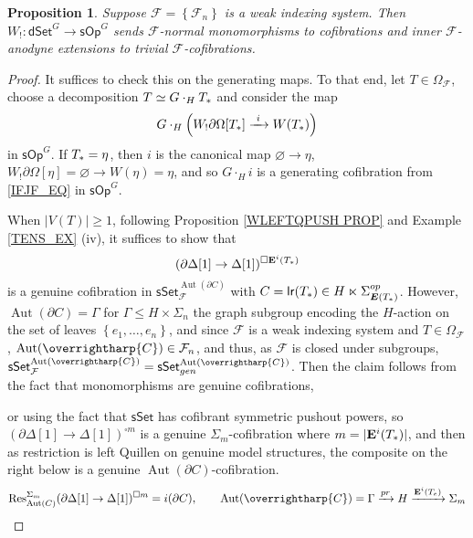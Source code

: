 \documentclass[a4paper,10pt
,draft
]{article}%
\numberwithin{equation}{section}
\numberwithin{figure}{section}
\newtheorem{proposition}[equation]{Proposition}%
\theoremstyle{definition} %
\newcommand{\set}[1]{\left\{#1\right\}}%
\newcommand{\vect}[1]{\text{\overrightharp{\ensuremath{#1}}}}
\newcommand{\sSet}{\ensuremath{\mathsf{sSet}}}%
\newcommand{\sOp}{\ensuremath{\mathsf{sOp}}}%
\newcommand{\dSet}{\mathsf{dSet}}
\DeclareMathOperator{\Aut}{Aut}%
\newcommand{\F}{\ensuremath{\mathcal F}}
\newcommand{\1}{\ensuremath{\mathbbm 1}}%
\begin{document}
\begin{proposition}
      \label{W!_COF_PROP}
      Suppose $\F = \set{\F_n}$ is a weak indexing system.
      Then $W_!: \dSet^G \to \sOp^G$ sends $\F$-normal monomorphisms to cofibrations and inner $\F$-anodyne extensions to trivial $\F$-cofibrations.
\end{proposition}
\begin{proof}
      It suffices to check this on the generating maps.
      To that end, let $T \in \Omega_\F$, choose a decomposition $T \simeq G \cdot_H T_{\**}$ and consider the map
       \begin{equation}
            G \cdot_H \left( W_! \partial \Omega[T_{\**}] \xrightarrow{\ i \ } W(T_{\**}) \right)      
      \end{equation}
      in $\sOp^G$.
      If $T_{\**} = \eta$, then $i$ is the canonical map $\varnothing \to \eta$,
      $W_! \partial \Omega[\eta] = \varnothing \to W(\eta) = \eta$,
      and so $G \cdot_H i$ is a generating cofibration from \eqref{IFJF_EQ} in $\sOp^G$.
      
      When $|V(T)| \geq 1$, following Proposition \ref{WLEFTQPUSH PROP} and Example \ref{TENS_EX} (iv),
      it suffices to show that
      \[
            (\partial \Delta[1] \to \Delta[1])^{\square \mathbf E^i(T_{\**})}
      \]
      is a genuine cofibration in $\sSet^{\Aut(\partial C)}_\F$ with $C = \mathsf{lr}(T_{\**}) \in H \ltimes \Sigma_{\boldsymbol{E}(T_{\**})}^{op}$.
      However, $\Aut(\partial C) = \Gamma$ for $\Gamma \leq H \times \Sigma_n$ the graph subgroup encoding the $H$-action on the set of leaves $\set{e_1, \dots, e_n}$,
      and since $\F$ is a weak indexing system and $T \in \Omega_\F$,
      $\Aut(\vect C) \in \F_n$,
      and thus, as $\F$ is closed under subgroups, $\sSet^{\Aut(\vect C)}_\F = \sSet^{\Aut(\vect C)}_{gen}$.
      Then the claim follows from the fact that monomorphisms are genuine cofibrations,
      {\color{OliveGreen} %
        or using the fact that $\sSet$ has cofibrant symmetric pushout powers,
        so $(\partial \Delta[1] \to \Delta[1])^{\square m}$ is a genuine $\Sigma_m$-cofibration where $m = |\mathbf E^i(T_{\**})|$,
        and then as restriction is left Quillen on genuine model structures,
        the composite on the right below is a genuine $\Aut(\partial C)$-cofibration.
        \[
              \mathrm{Res}^{\Sigma_m}_{\Aut(C)}(\partial \Delta[1] \to \Delta[1])^{\square m} = i(\partial C),
              \qquad
              \Aut(\vect C) = \Gamma \xrightarrow{pr} H \xrightarrow{\mathbf E^i(T_e)} \Sigma_m
        \]

}
\end{proof}
\end{document}
